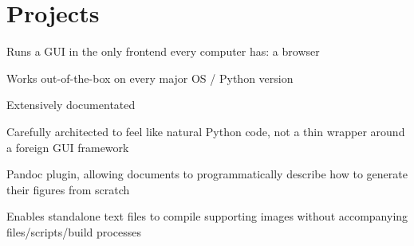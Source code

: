 \section{Projects}

\begin{tightemize}
\item Runs a GUI in the only frontend every computer has: a browser
\item Works out-of-the-box on every major OS / Python version
\item Extensively documentated
\item Carefully architected to feel like natural Python code, not a thin wrapper around a foreign GUI framework
\end{tightemize}

\sectionsep

%

\begin{tightemize}
\item Pandoc plugin, allowing documents to programmatically describe how to generate their figures from scratch
\item Enables standalone text files to compile supporting images without accompanying files/scripts/build processes
\end{tightemize}
\sectionsep

